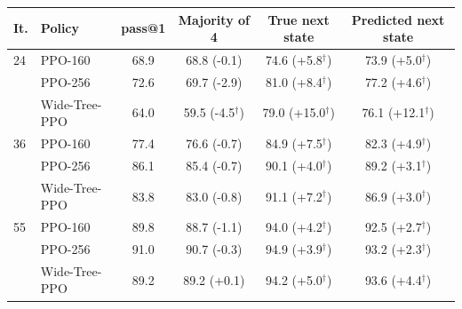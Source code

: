\begin{tabular}{l l c c c c}
\toprule
It. & Policy & pass@1 & Majority of 4 & True next state & Predicted next state \\
\midrule
24 & PPO-160 & 68.9 & 68.8 (-0.1) & 74.6 (+5.8$^\dagger$) & 73.9 (+5.0$^\dagger$) \\
 & PPO-256 & 72.6 & 69.7 (-2.9) & 81.0 (+8.4$^\dagger$) & 77.2 (+4.6$^\dagger$) \\
 & Wide-Tree-PPO & 64.0 & 59.5 (-4.5$^\dagger$) & 79.0 (+15.0$^\dagger$) & 76.1 (+12.1$^\dagger$) \\
\midrule
36 & PPO-160 & 77.4 & 76.6 (-0.7) & 84.9 (+7.5$^\dagger$) & 82.3 (+4.9$^\dagger$) \\
 & PPO-256 & 86.1 & 85.4 (-0.7) & 90.1 (+4.0$^\dagger$) & 89.2 (+3.1$^\dagger$) \\
 & Wide-Tree-PPO & 83.8 & 83.0 (-0.8) & 91.1 (+7.2$^\dagger$) & 86.9 (+3.0$^\dagger$) \\
\midrule
55 & PPO-160 & 89.8 & 88.7 (-1.1) & 94.0 (+4.2$^\dagger$) & 92.5 (+2.7$^\dagger$) \\
 & PPO-256 & 91.0 & 90.7 (-0.3) & 94.9 (+3.9$^\dagger$) & 93.2 (+2.3$^\dagger$) \\
 & Wide-Tree-PPO & 89.2 & 89.2 (+0.1) & 94.2 (+5.0$^\dagger$) & 93.6 (+4.4$^\dagger$) \\
\bottomrule
\end{tabular}
